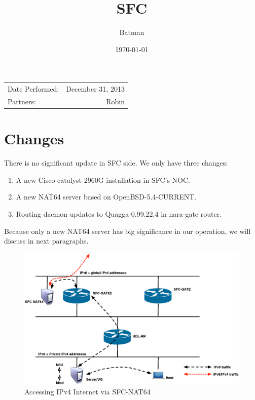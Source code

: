 \documentclass{article}
\title{SFC} %
\author{Batman} %
\date{\today} %
\begin{document}
\maketitle %

\begin{center}
\begin{tabular}{l r}
Date Performed: & December 31, 2013 \\ %
Partners: & Robin \\ %
\end{tabular}
\end{center}



\section{Changes}

There is no significant update in SFC side.  
We only have three changes:
\begin{enumerate}
\item A new Cisco catalyst 2960G installation in SFC's NOC. 
\item A new NAT64 server based on OpenBSD-5.4-CURRENT.
\item Routing daemon updates to Quagga-0.99.22.4 in nara-gate router. 
\end{enumerate}

Because only a new NAT64 server has big significance in our operation, we will discuss in next paragraphs.  

\begin{figure}[h!]
\centering
\includegraphics[width=1.\textwidth]{nat64}
\caption{Accessing IPv4 Internet via SFC-NAT64}
\end{figure}
\end{document}
